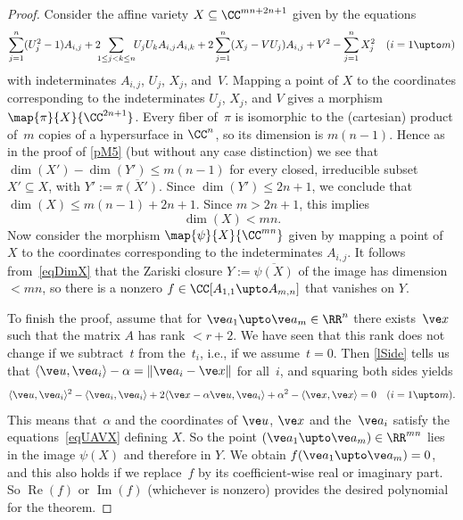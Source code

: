 \documentclass[reqno]{amsart}
\begin{document}
\begin{proof}
  Consider the affine variety $X \subseteq \CC^{m n + 2 n + 1}$ given
  by the equations
  \begin{equation} \label{eqUAVX} \sum_{j=1}^n (U_j^2 - 1) A_{i,j} + 2
    \!\!\! \sum_{1 \le j < k \le n} \!\! U_j U_k A_{i,j} A_{i,k} + 2
    \sum_{j=1}^n (X_j - V U_j) A_{i,j} + V^2 - \sum_{j=1}^n X_j^2
    \quad (i = 1 \upto m)
  \end{equation}
  with indeterminates $A_{i,j}$, $U_j$, $X_j$, and~$V$. Mapping a
  point of $X$ to the coordinates corresponding to the indeterminates
  $U_j$, $X_j$, and $V$ gives a morphism
  $\map{\pi}{X}{\CC^{2 n + 1}}$. Every fiber of~$\pi$ is isomorphic to
  the (cartesian) product of~$m$ copies of a hypersurface in $\CC^n$,
  so its dimension is $m (n-1)$. Hence as in the proof of \cref{pM5}
  (but without any case distinction) we see that
  $\dim(X') - \dim(Y') \le m (n-1)$ for every closed, irreducible
  subset $X' \subseteq X$, with $Y' := \overline{\pi(X')}$. Since
  $\dim(Y') \le 2 n + 1$, we conclude that
  $\dim(X) \le m (n-1) + 2 n + 1$. Since $m > 2 n + 1$, this implies
  \begin{equation} \label{eqDimX}%
    \dim(X) < m n.
  \end{equation}
  Now consider the morphism $\map{\psi}{X}{\CC^{m n}}$ given by
  mapping a point of $X$ to the coordinates corresponding to the
  indeterminates $A_{i,j}$. It follows from~\eqref{eqDimX} that the
  Zariski closure $Y := \overline{\psi(X)}$ of the image has dimension
  $< m n$, so there is a nonzero $f \in \CC[A_{1,1} \upto A_{m,n}]$
  that vanishes on $Y$.
  
  To finish the proof, assume that for
  $\ve a_1 \upto \ve a_m \in \RR^n$ there exists~$\ve x$ such that the
  matrix $A$ has rank $< r + 2$. We have seen that this rank does not
  change if we subtract~$t$ from the~$t_i$, i.e., if we
  assume~$t = 0$. Then \cref{lSide} tells us that
  $\langle\ve u,\ve a_i\rangle - \alpha = \lVert\ve a_i - \ve x\rVert$
  for all~$i$, and squaring both sides yields
  \begin{equation} \label{eqUAX}%
    \langle\ve u,\ve a_i\rangle^2 - \langle\ve a_i,\ve a_i\rangle + 2
    \langle \ve x - \alpha \ve u,\ve a_i\rangle + \alpha^2 -
    \langle\ve x,\ve x\rangle = 0 \quad (i = 1 \upto m).
  \end{equation}
  This means that~$\alpha$ and the coordinates of $\ve u$, $\ve x$ and
  the~$\ve a_i$ satisfy the equations~\eqref{eqUAVX} defining $X$. So
  the point $(\ve a_1 \upto \ve a_m) \in \RR^{m n}$ lies in the image
  $\psi(X)$ and therefore in $Y$. We obtain
  $f(\ve a_1 \upto \ve a_m) = 0$, and this also holds if we
  replace~$f$ by its coefficient-wise real or imaginary part. So
  $\operatorname{Re}(f)$ or $\operatorname{Im}(f)$ (whichever is
  nonzero) provides the desired polynomial for the theorem.
\end{proof}
\end{document}

